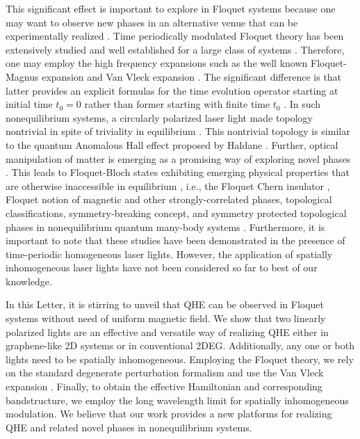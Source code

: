 \documentclass[aps,prl,showpacs,twocolumn,amsmath,amssymb,superscriptaddress]{revtex4-2}
\begin{document}
This significant effect is important to explore in Floquet systems \cite{NHL, AEE} because one may want to observe new phases in an alternative venue that can be experimentally realized \cite{MCR, YHW, HZJ, JWM}. Time periodically modulated Floquet theory has been extensively studied and well established for a large class of systems \cite{JHS,HSA,MGP,MBL,AEE,NGJ}. Therefore, one may employ the high frequency expansions \cite{MBL,AEE,NGJ,SRI,API,TMS,ESM,TKT,ALA} such as the well known Floquet-Magnus expansion \cite{ESM,TKT,ALA,FCA} and Van Vleck expansion \cite{MBL,AEE}. The significant difference is that latter provides an explicit formulas for the time evolution operator starting at initial time $t_{0}=0$ rather than former starting with finite time $t_{0}$ \cite{supp}. In such nonequilibrium systems, a circularly polarized laser light made topology nontrivial in spite of triviality in equilibrium \cite{TKO}. This nontrivial topology is similar to the quantum Anomalous Hall effect proposed by Haldane \cite{Haldane}. Further, optical manipulation of matter is emerging as a promising way of exploring novel phases \cite{AKA, JHM}. This leads to Floquet-Bloch states exhibiting emerging physical properties that are otherwise inaccessible in equilibrium \cite{LST}, i.e., the Floquet Chern insulator \cite{AGG}, Floquet notion of magnetic and other strongly-correlated phases\cite{MSR}, topological classifications, symmetry-breaking concept, and symmetry protected topological phases in nonequilibrium quantum many-body systems \cite{EKM, MSR}. Furthermore, it is important to note that these studies have been demonstrated in the presence of time-periodic homogeneous laser lights. However, the application of spatially inhomogeneous \cite{SWP1, SWP2, SWP3, SWP4, SWP5} laser lights have not been considered so far to best of our knowledge.

In this Letter, it is stirring to unveil that QHE can be observed in Floquet systems without need of uniform magnetic field. We show that two linearly polarized lights are an effective and versatile way of realizing QHE either in graphene-like 2D systems or in conventional 2DEG. Additionally, any one or both lights need to be spatially inhomogeneous. Employing the Floquet theory, we rely on the standard degenerate perturbation formalism and use the Van Vleck expansion \cite{MBL, supp, AEE}. Finally, to obtain the effective Hamiltonian and corresponding bandstructure, we employ the long wavelength limit for spatially inhomogeneous modulation. We believe that our work provides a new platforms for realizing QHE and related novel phases in nonequilibrium systems.
\end{document}
